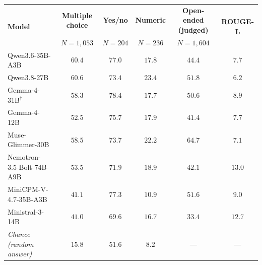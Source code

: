 \begin{tabular}{lccccc}
\toprule
\multirow{2}{*}{\textbf{Model}} & \textbf{Multiple choice} & \textbf{Yes/no} & \textbf{Numeric} & \textbf{Open-ended (judged)} & \multirow{2}{*}{\textbf{ROUGE-L}} \\
 & $N=1{,}053$ & $N=204$ & $N=236$ & $N=1{,}604$ & \\
\midrule
Qwen3.6-35B-A3B & $60.4$ & $77.0$ & $17.8$ & $44.4$ & $7.7$ \\
Qwen3.8-27B & $\mathbf{60.6}$ & $73.4$ & $\mathbf{23.4}$ & $51.8$ & $6.2$ \\
Gemma-4-31B$^\dagger$ & $58.3$ & $\mathbf{78.4}$ & $17.7$ & $50.6$ & $8.9$ \\
Gemma-4-12B & $52.5$ & $75.7$ & $17.9$ & $41.4$ & $7.7$ \\
Muse-Glimmer-30B & $58.5$ & $73.7$ & $22.2$ & $\mathbf{64.7}$ & $7.1$ \\
Nemotron-3.5-Bolt-74B-A9B & $53.5$ & $71.9$ & $18.9$ & $42.1$ & $\mathbf{13.0}$ \\
MiniCPM-V-4.7-35B-A3B & $41.1$ & $77.3$ & $10.9$ & $51.6$ & $9.0$ \\
Ministral-3-14B & $41.0$ & $69.6$ & $16.7$ & $33.4$ & $12.7$ \\
\midrule
\textit{Chance (random answer)} & $15.8$ & $51.6$ & $8.2$ & --- & --- \\
\bottomrule
\end{tabular}
